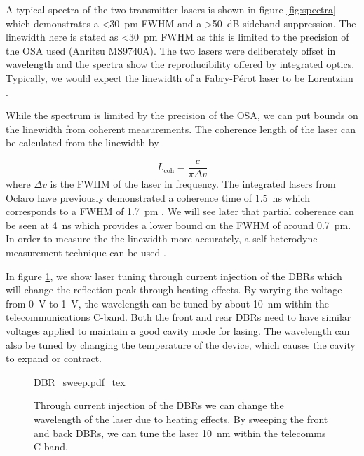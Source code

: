 A typical spectra of the two transmitter lasers is shown in figure \ref{fig:spectra} which demonstrates a \SI{<30}{pm} \ac{FWHM} and a \SI{>50}{dB} sideband suppression. The linewidth here is stated as \SI{<30}{pm} \ac{FWHM} as this is limited to the precision of the \ac{OSA} used (Anritsu MS9740A). The two lasers were deliberately offset in wavelength and the spectra show the reproducibility offered by integrated optics. Typically, we would expect the linewidth of a Fabry-P\'{e}rot laser to be Lorentzian \cite{Ismail16}. 

While the spectrum is limited by the precision of the \ac{OSA}, we can put bounds on the linewidth from coherent measurements. The coherence length of the laser can be calculated from the linewidth by

\begin{equation}
	L_\text{coh} = \frac{c}{\pi\Delta v}
\end{equation}
where $\Delta v$ is the \ac{FWHM} of the laser in frequency. The integrated lasers from Oclaro have previously demonstrated a coherence time of \SI{1.5}{ns} which corresponds to a \ac{FWHM} of \SI{1.7}{pm} \cite{Sibson2017InP}. We will see later that partial coherence can be seen at \SI{4}{ns} which provides a lower bound on the \ac{FWHM} of around \SI{0.7}{pm}. In order to measure the the linewidth more accurately, a self-heterodyne measurement technique can be used \cite{self-heterodyne}. 

In figure \ref{fig:DBR_sweep}, we show laser tuning through current injection of the \acp{DBR} which will change the reflection peak through heating effects. By varying the voltage from \SI{0}{\V} to \SI{1}{\V}, the wavelength can be tuned by about \SI{10}{\nm} within the telecommunications C-band. Both the front and rear \acp{DBR} need to have similar voltages applied to maintain a good cavity mode for lasing. The wavelength can also be tuned by changing the temperature of the device, which causes the cavity to expand or contract. 

\begin{figure}[tp]
	\centering
	\small
	\def\svgwidth{0.8\textwidth} 
	{DBR_sweep.pdf_tex}
	\caption[Laser wavelength scan with DBR current injection]{Through current injection of the \acp{DBR} we can change the wavelength of the laser due to heating effects. By sweeping the front and back \acp{DBR}, we can tune the laser \SI{10}{\nm} within the telecomms C-band.}
	\label{fig:DBR_sweep}
\end{figure}

